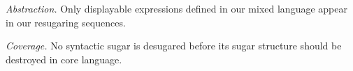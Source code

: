 \emph{Abstraction.} Only displayable expressions defined in our mixed language appear in our resugaring sequences.

\emph{Coverage.} No syntactic sugar is desugared before its sugar structure should be destroyed in core language.











